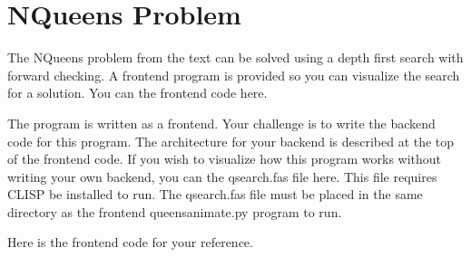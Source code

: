 \documentclass[letterpaper,10pt,english]{sphinxmanual}
\begin{document}
\begin{sphinxVerbatim}[commandchars=\\\{\},numbers=left,firstnumber=1,stepnumber=1]
    
   
    
    
\end{sphinxVerbatim}


\section{N\sphinxhyphen{}Queens Problem}
\label{\detokenize{chap12/chap12:n-queens-problem}}
The N\sphinxhyphen{}Queens problem from the text can be solved using a depth first search with forward checking. A front\sphinxhyphen{}end program is provided so you can visualize the search for a solution. You can  the front\sphinxhyphen{}end code here.

The program is written as a front\sphinxhyphen{}end. Your challenge is to write the back\sphinxhyphen{}end code for this program. The architecture for your back\sphinxhyphen{}end is described at the top of the front\sphinxhyphen{}end code.
If you wish to visualize how this program works without writing your own back\sphinxhyphen{}end, you can  the qsearch.fas file here. This file requires CLISP be installed to run. The qsearch.fas file must be placed in the same directory as the front\sphinxhyphen{}end queensanimate.py program to run.

Here is the front\sphinxhyphen{}end code for your reference.
\end{document}
